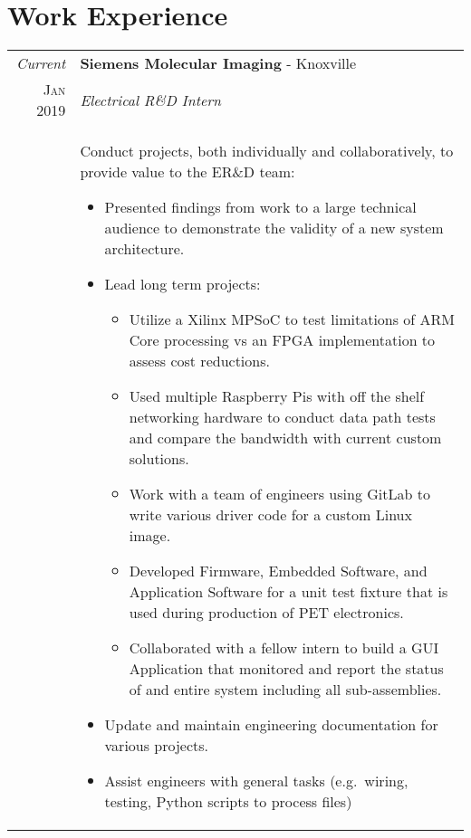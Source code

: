 \documentclass[a4paper,11pt]{article}
\begin{document}
\section{Work Experience}
\begin{tabularx}{\textwidth}{r|X}
   \emph{Current} & \textbf{Siemens Molecular Imaging} \-- Knoxville\\
   \textsc{Jan 2019} & \emph{Electrical R\&D Intern}\\
   & \small{Conduct projects, both individually and collaboratively, to provide value to the ER\&D team:
      \begin{itemize}[leftmargin=20pt,topsep=1pt,itemsep=1pt,partopsep=0pt, parsep=1pt]
         \item Presented findings from work to a large technical audience to demonstrate the validity of a new system architecture.
         \item Lead long term projects:
            \begin{itemize}[leftmargin=20pt,topsep=1pt,itemsep=1pt,partopsep=0pt, parsep=1pt]
               \item Utilize a Xilinx MPSoC to test limitations of ARM Core processing vs an FPGA implementation to assess cost reductions.
               \item Used multiple Raspberry Pis with off the shelf networking hardware to conduct data path tests and compare the bandwidth with current custom solutions.
               \item Work with a team of engineers using GitLab to write various driver code for a custom Linux image.
               \item Developed Firmware, Embedded Software, and Application Software for a unit test fixture that is used during production of PET electronics.
               \item Collaborated with a fellow intern to build a GUI Application that monitored and report the status of and entire system including all sub-assemblies.
            \end{itemize}
         \item Update and maintain engineering documentation for various projects.
         \item Assist engineers with general tasks (e.g.\ wiring, testing, Python scripts to process files)
      \vspace{-0.5cm}
      \end{itemize}}\\
\end{tabularx}
\end{document}
